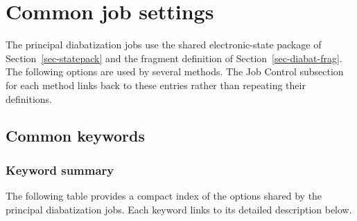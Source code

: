 \section{Common job settings}\label{sec-diabat-settings}
The principal diabatization jobs use the shared electronic-state package of Section~\ref{sec-statepack} and the fragment definition of Section~\ref{sec-diabat-frag}. The following options are used by several methods. The Job Control subsection for each method links back to these entries rather than repeating their definitions.

\subsection{Common keywords}
\subsubsection*{Keyword summary}
The following table provides a compact index of the options shared by the principal diabatization jobs. Each keyword links to its detailed description below.
\begin{keywordoverview}
\end{keywordoverview}
